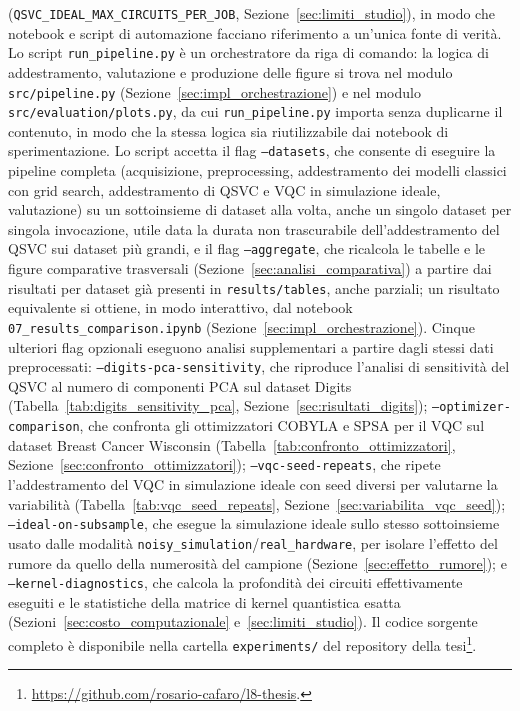 \begin{sloppypar}
(\texttt{QSVC\_IDEAL\_MAX\_CIRCUITS\_PER\_JOB}, Sezione~\ref{sec:limiti_studio}), in modo che notebook e script di automazione facciano riferimento a un'unica fonte di verità. Lo script \texttt{run\_pipeline.py} è un orchestratore da riga di comando: la logica di addestramento, valutazione e produzione delle figure si trova nel modulo \texttt{src/pipeline.py} (Sezione~\ref{sec:impl_orchestrazione}) e nel modulo \texttt{src/evaluation/plots.py}, da cui \texttt{run\_pipeline.py} importa senza duplicarne il contenuto, in modo che la stessa logica sia riutilizzabile dai notebook di sperimentazione. Lo script accetta il flag \texttt{--datasets}, che consente di eseguire la pipeline completa (acquisizione, preprocessing, addestramento dei modelli classici con grid search, addestramento di QSVC e VQC in simulazione ideale, valutazione) su un sottoinsieme di dataset alla volta, anche un singolo dataset per singola invocazione, utile data la durata non trascurabile dell'addestramento del QSVC sui dataset più grandi, e il flag \texttt{--aggregate}, che ricalcola le tabelle e le figure comparative trasversali (Sezione~\ref{sec:analisi_comparativa}) a partire dai risultati per dataset già presenti in \texttt{results/tables}, anche parziali; un risultato equivalente si ottiene, in modo interattivo, dal notebook \texttt{07\_results\_comparison.ipynb} (Sezione~\ref{sec:impl_orchestrazione}). Cinque ulteriori flag opzionali eseguono analisi supplementari a partire dagli stessi dati preprocessati: \texttt{--digits-pca-sensitivity}, che riproduce l'analisi di sensitività del QSVC al numero di componenti PCA sul dataset Digits (Tabella~\ref{tab:digits_sensitivity_pca}, Sezione~\ref{sec:risultati_digits}); \texttt{--optimizer-comparison}, che confronta gli ottimizzatori COBYLA e SPSA per il VQC sul dataset Breast Cancer Wisconsin (Tabella~\ref{tab:confronto_ottimizzatori}, Sezione~\ref{sec:confronto_ottimizzatori}); \texttt{--vqc-seed-repeats}, che ripete l'addestramento del VQC in simulazione ideale con seed diversi per valutarne la variabilità (Tabella~\ref{tab:vqc_seed_repeats}, Sezione~\ref{sec:variabilita_vqc_seed}); \texttt{--ideal-on-subsample}, che esegue la simulazione ideale sullo stesso sottoinsieme usato dalle modalità \texttt{noisy\_simulation}/\texttt{real\_hardware}, per isolare l'effetto del rumore da quello della numerosità del campione (Sezione~\ref{sec:effetto_rumore}); e \texttt{--kernel-diagnostics}, che calcola la profondità dei circuiti effettivamente eseguiti e le statistiche della matrice di kernel quantistica esatta (Sezioni~\ref{sec:costo_computazionale} e~\ref{sec:limiti_studio}). Il codice sorgente completo è disponibile nella cartella \texttt{experiments/} del repository della tesi\footnote{\url{https://github.com/rosario-cafaro/l8-thesis}.}.
\end{sloppypar}

